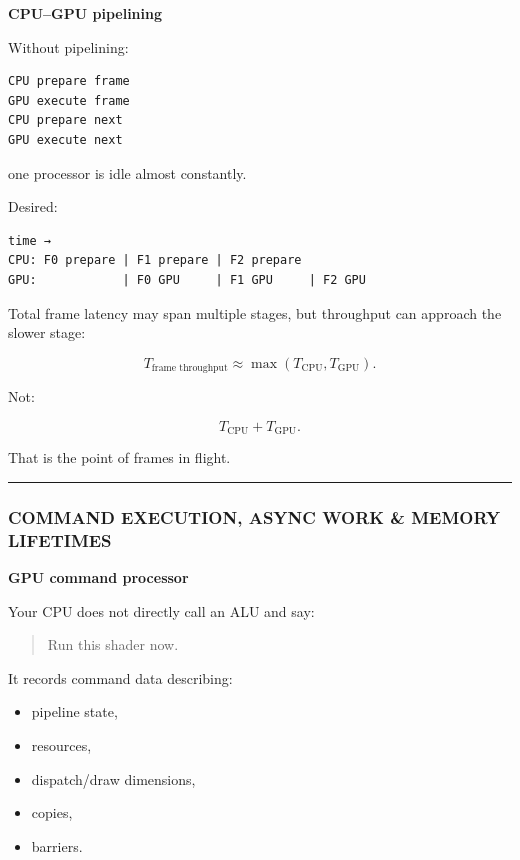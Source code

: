 \textbf{CPU--GPU pipelining}

Without pipelining:

\protect{}\label{p10-serialized}%
\begin{verbatim}
CPU prepare frame
GPU execute frame
CPU prepare next
GPU execute next
\end{verbatim}

one processor is idle almost constantly.

Desired:

\protect{}\label{p10-pipeline}%
\begin{verbatim}
time →
CPU: F0 prepare | F1 prepare | F2 prepare
GPU:            | F0 GPU     | F1 GPU     | F2 GPU
\end{verbatim}

Total frame latency may span multiple stages, but throughput can approach the slower stage:

\[
T_{\text{frame throughput}}
\approx
\max(
T_{\text{CPU}},
T_{\text{GPU}}
).
\]

Not:

\[
T_{\text{CPU}}+T_{\text{GPU}}.
\]

That is the point of frames in flight.

\begin{center}\rule{0.5\linewidth}{0.5pt}\end{center}

\subsubsection{COMMAND EXECUTION, ASYNC WORK \& MEMORY LIFETIMES}\label{05-engine-i-ch019-command-execution-async-work-memory-lifetimes}

\textbf{GPU command processor}

Your CPU does not directly call an ALU and say:

\begin{quote}
Run this shader now.
\end{quote}

It records command data describing:

\begin{itemize}
\tightlist
\item
  pipeline state,
\item
  resources,
\item
  dispatch/draw dimensions,
\item
  copies,
\item
  barriers.
\end{itemize}

